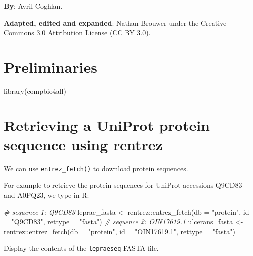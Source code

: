 \documentclass[
]{book}
\newenvironment{Shaded}{\begin{snugshade}}{\end{snugshade}}
\newcommand{\AttributeTok}[1]{\textcolor[rgb]{0.77,0.63,0.00}{#1}}
\newcommand{\CommentTok}[1]{\textcolor[rgb]{0.56,0.35,0.01}{\textit{#1}}}
\newcommand{\FunctionTok}[1]{\textcolor[rgb]{0.00,0.00,0.00}{#1}}
\newcommand{\NormalTok}[1]{#1}
\newcommand{\OtherTok}[1]{\textcolor[rgb]{0.56,0.35,0.01}{#1}}
\newcommand{\SpecialCharTok}[1]{\textcolor[rgb]{0.00,0.00,0.00}{#1}}
\newcommand{\StringTok}[1]{\textcolor[rgb]{0.31,0.60,0.02}{#1}}
\begin{document}
\textbf{By}: Avril Coghlan.

\textbf{Adapted, edited and expanded}: Nathan Brouwer under the Creative Commons 3.0 Attribution License \href{https://creativecommons.org/licenses/by/3.0/}{(CC BY 3.0)}.

\hypertarget{preliminaries-4}{%
\section{Preliminaries}\label{preliminaries-4}}

\begin{Shaded}
\begin{Highlighting}[]
\FunctionTok{library}\NormalTok{(compbio4all)}
\end{Highlighting}
\end{Shaded}

\hypertarget{retrieving-a-uniprot-protein-sequence-using-rentrez}{%
\section{Retrieving a UniProt protein sequence using rentrez}\label{retrieving-a-uniprot-protein-sequence-using-rentrez}}

We can use \texttt{entrez\_fetch()} to download protein sequences.

For example to retrieve the protein sequences for UniProt accessions Q9CD83 and A0PQ23, we type in R:

\begin{Shaded}
\begin{Highlighting}[]
\CommentTok{\# sequence 1: Q9CD83}
\NormalTok{leprae\_fasta }\OtherTok{\textless{}{-}}\NormalTok{ rentrez}\SpecialCharTok{::}\FunctionTok{entrez\_fetch}\NormalTok{(}\AttributeTok{db =} \StringTok{"protein"}\NormalTok{,}
                        \AttributeTok{id =} \StringTok{"Q9CD83"}\NormalTok{,}
                         \AttributeTok{rettype =} \StringTok{"fasta"}\NormalTok{)}
\CommentTok{\# sequence 2: OIN17619.1}
\NormalTok{ulcerans\_fasta }\OtherTok{\textless{}{-}}\NormalTok{ rentrez}\SpecialCharTok{::}\FunctionTok{entrez\_fetch}\NormalTok{(}\AttributeTok{db =} \StringTok{"protein"}\NormalTok{,}
                         \AttributeTok{id =} \StringTok{"OIN17619.1"}\NormalTok{,}
                         \AttributeTok{rettype =} \StringTok{"fasta"}\NormalTok{)}
\end{Highlighting}
\end{Shaded}

Display the contents of the \texttt{lepraeseq} FASTA file.
\end{document}
